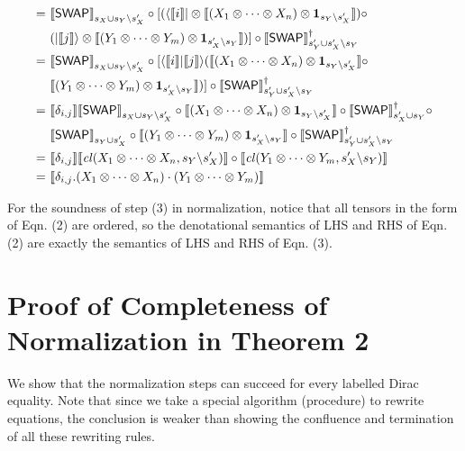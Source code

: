 \documentclass[runningheads]{llncs}
\def\>{\ensuremath{\rangle}}
\def\<{\ensuremath{\langle}}
\newcommand {\Swap } {{\mathsf{SWAP}}}
\begin{document}
\begin{itemize}
\begin{align*}
    =\ & \sem{\Swap}_{s_X\cup s_Y\backslash s_X'}\circ[(\<\sem{i}| \otimes \sem{(X_1\otimes\cdots\otimes X_n) \otimes \mathbf{1}_{s_Y\backslash s_X'}})\circ \\
    &(|\sem{j}\> \otimes \sem{(Y_1\otimes\cdots\otimes Y_m) \otimes \mathbf{1}_{s_X'\backslash s_Y}})]\circ \sem{\Swap}_{s_Y'\cup s_X'\backslash s_Y}^\dagger\\
    =\ & \sem{\Swap}_{s_X\cup s_Y\backslash s_X'}\circ[\<\sem{i}|\sem{j}\> (\sem{(X_1\otimes\cdots\otimes X_n) \otimes \mathbf{1}_{s_Y\backslash s_X'}}\circ \\
    &\sem{(Y_1\otimes\cdots\otimes Y_m) \otimes \mathbf{1}_{s_X'\backslash s_Y}})]\circ \sem{\Swap}_{s_Y'\cup s_X'\backslash s_Y}^\dagger\\
    =\ & \sem{\delta_{i,j}} \sem{\Swap}_{s_X\cup s_Y\backslash s_X'}\circ\sem{(X_1\otimes\cdots\otimes X_n) \otimes \mathbf{1}_{s_Y\backslash s_X'}}\circ \sem{\Swap}_{s_X'\cup s_Y}^\dagger \circ \\
    &\sem{\Swap}_{s_Y\cup s_X'} \circ \sem{(Y_1\otimes\cdots\otimes Y_m) \otimes \mathbf{1}_{s_X'\backslash s_Y}}\circ \sem{\Swap}_{s_Y'\cup s_X'\backslash s_Y}^\dagger\\
    =\ & \sem{\delta_{i,j}} \sem{\cl(X_1\otimes\cdots\otimes X_n, s_Y\backslash s_X')}\circ 
    \sem{\cl(Y_1\otimes\cdots\otimes Y_m, s_X'\backslash s_Y)} \\
    =\ & \sem{\delta_{i,j}. (X_1\otimes\cdots\otimes X_n)\cdot (Y_1\otimes\cdots\otimes Y_m)}
  \end{align*}
\end{itemize}

For the soundness of step (3) in normalization, notice that all tensors in the form of Eqn. (2) are ordered, so the denotational semantics of LHS and RHS of Eqn. (2) are exactly the semantics of LHS and RHS of Eqn. (3).

\section{Proof of Completeness of Normalization in Theorem 2}
We show that the normalization steps can succeed for every labelled Dirac equality.
Note that since we take a special algorithm (procedure) to rewrite equations, the conclusion is weaker than showing the confluence and termination of all these rewriting rules.
\end{document}
